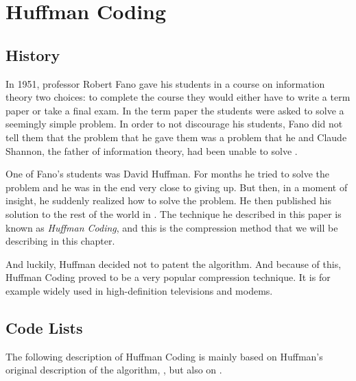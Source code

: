 \begin{comment}
  
\end{comment}


\chapter{Huffman Coding}
\label{cha:huffman}

\section{History}

In 1951, professor Robert Fano gave his students in a course on
information theory two choices: to complete the course they would
either have to write a term paper or take a final exam. In the term
paper the students were asked to solve a seemingly simple problem. In
order to not discourage his students, Fano did not tell them that the
problem that he gave them was a problem that he and Claude Shannon,
the father of information theory, had been unable to
solve \cite{stix91:_profil}.

One of Fano's students was David Huffman. For months he tried to solve
the problem and he was in the end very close to giving up. But then,
in a moment of insight, he suddenly realized how to solve the
problem. He then published his solution to the rest of the world in
\cite{huf52}. The technique he described in this paper is known as
\textit{Huffman Coding}, and this is the compression method that we
will be describing in this chapter.

And luckily, Huffman decided not to patent the algorithm. And because
of this, Huffman Coding proved to be a very popular compression
technique. It is for example widely used in high-definition
televisions and modems.

\section{Code Lists}

The following description of Huffman Coding is mainly based on
Huffman's original description of the algorithm, \cite{huf52}, but
also on
\cite{Salomon:2004:DCC,mark1996data_compression_book,mcfadden92:_hackin_data_compr,mahoney11:_data_compr_explain,Lelewer:1987:DC:45072.45074,cormen2009introduction_to_algo,TRArithmetic}.

